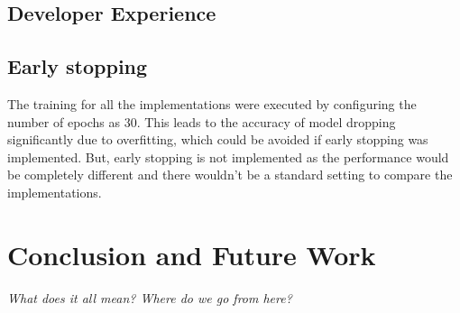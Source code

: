 \section{Developer Experience}

\section{Early stopping}
The training for all the implementations were executed by configuring the number of epochs as 30. This leads to the accuracy of model dropping significantly due to overfitting, which could be avoided if early stopping was implemented.
But, early stopping is not implemented as the performance would be completely different and there wouldn't be a standard setting to compare the implementations.

\chapter{Conclusion and Future Work}
\textit{What does it all mean? Where do we go from here?}
